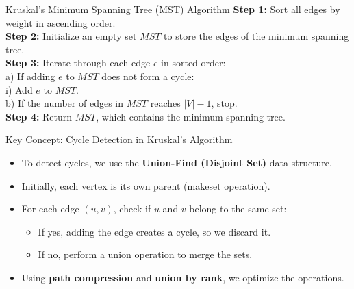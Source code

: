 \begin{frame}{Kruskal's Minimum Spanning Tree (MST) Algorithm}
    \textbf{Step 1:} Sort all edges by weight in ascending order. \\
    \textbf{Step 2:} Initialize an empty set \( MST \) to store the edges of the minimum spanning tree. \\
    \textbf{Step 3:} Iterate through each edge \( e \) in sorted order: \\
    \hspace{1cm} a) If adding \( e \) to \( MST \) does not form a cycle: \\
    \hspace{2cm} i) Add \( e \) to \( MST \). \\
    \hspace{1cm} b) If the number of edges in \( MST \) reaches \( |V| - 1 \), stop. \\
    \textbf{Step 4:} Return \( MST \), which contains the minimum spanning tree. \\
\end{frame}

\begin{frame}{Key Concept: Cycle Detection in Kruskal's Algorithm}
    \begin{itemize}
        \item To detect cycles, we use the \textbf{Union-Find (Disjoint Set)} data structure.
        \item Initially, each vertex is its own parent (makeset operation).
        \item For each edge \( (u, v) \), check if \( u \) and \( v \) belong to the same set:
        \begin{itemize}
            \item If yes, adding the edge creates a cycle, so we discard it.
            \item If no, perform a union operation to merge the sets.
        \end{itemize}
        \item Using \textbf{path compression} and \textbf{union by rank}, we optimize the operations.
    \end{itemize}
\end{frame}


